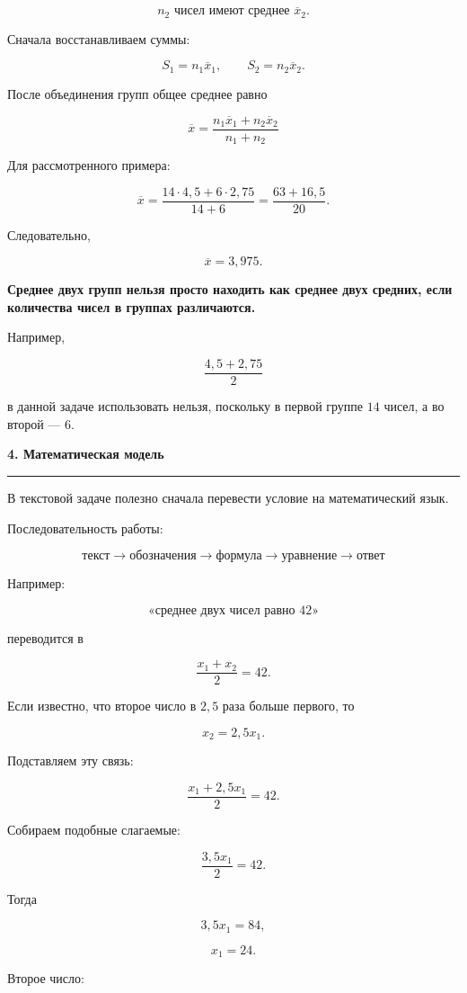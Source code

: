 \documentclass[a4paper,12pt]{article}
\newcommand{\topicsection}[1]{%
    \vspace{0.7em}
    {\Large\bfseries\color{darkaccent}#1}\par
    \vspace{0.15em}
    {\color{accent}\rule{\linewidth}{0.7pt}}
    \vspace{0.35em}
}
\newcommand{\important}[1]{%
    \vspace{0.35em}
    \noindent
    \begin{minipage}{\linewidth}
        \color{darkaccent}\bfseries #1
    \end{minipage}
    \vspace{0.25em}
}
\begin{document}
\[
n_2 \text{ чисел имеют среднее } \overline{x}_2.
\]

Сначала восстанавливаем суммы:

\[
S_1=n_1\overline{x}_1,
\qquad
S_2=n_2\overline{x}_2.
\]

После объединения групп общее среднее равно

\[
\boxed{
\overline{x}
=
\frac{n_1\overline{x}_1+n_2\overline{x}_2}
     {n_1+n_2}
}
\]

Для рассмотренного примера:

\[
\overline{x}
=
\frac{14\cdot4{,}5+6\cdot2{,}75}{14+6}
=
\frac{63+16{,}5}{20}.
\]

Следовательно,

\[
\boxed{\overline{x}=3{,}975}.
\]

\important{Среднее двух групп нельзя просто находить как среднее двух средних, если количества чисел в группах различаются.}

Например,

\[
\frac{4{,}5+2{,}75}{2}
\]

в данной задаче использовать нельзя, поскольку в первой группе \(14\) чисел, а во второй --- \(6\).

\topicsection{4. Математическая модель}

В текстовой задаче полезно сначала перевести условие на математический язык.

Последовательность работы:

\[
\boxed{
\text{текст}
\longrightarrow
\text{обозначения}
\longrightarrow
\text{формула}
\longrightarrow
\text{уравнение}
\longrightarrow
\text{ответ}
}
\]

Например:

\[
\text{«среднее двух чисел равно }42\text{»}
\]

переводится в

\[
\frac{x_1+x_2}{2}=42.
\]

Если известно, что второе число в \(2{,}5\) раза больше первого, то

\[
\boxed{x_2=2{,}5x_1}.
\]

Подставляем эту связь:

\[
\frac{x_1+2{,}5x_1}{2}=42.
\]

Собираем подобные слагаемые:

\[
\frac{3{,}5x_1}{2}=42.
\]

Тогда

\[
3{,}5x_1=84,
\]

\[
x_1=24.
\]

Второе число:
\end{document}
